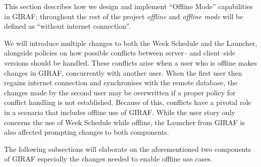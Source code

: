 This section describes how we design and implement \enquote{Offline Mode} capabilities in GIRAF; throughout the rest of the project \textit{offline} and \textit{offline mode} will be defined as \enquote{without internet connection}.

\begin{center}
\end{center}

We will introduce multiple changes to both the Week Schedule and the Launcher, alongside policies on how possible conflicts between server-- and client--side versions should be handled.
These conflicts arise when a user who is offline makes changes in GIRAF, concurrently with another user.
When the first user then regains internet connection and synchronises with the remote database, the changes made by the second user may be overwritten if a proper policy for conflict handling is not established.
Because of this, conflicts have a pivotal role in a scenario that includes offline use of GIRAF.
While the user story only concerns the use of Week Schedule while offline, the Launcher from GIRAF is also affected prompting changes to both components.

The following subsections will elaborate on the aforementioned two components of GIRAF especially the changes needed to enable offline use cases.
